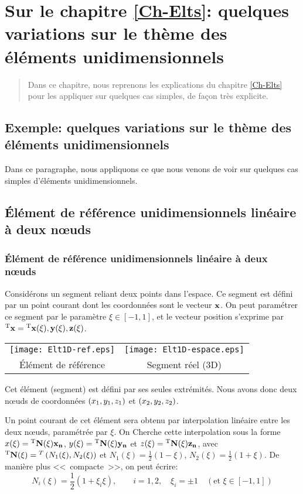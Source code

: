 \ifVersionAvecExemplesSepares
   \chapter{Sur le chapitre \ref{Ch-Elts}: quelques variations sur le thème des éléments unidimensionnels}
   \begin{abstract}
   Dans ce chapitre, nous reprenons les explications du chapitre \ref{Ch-Elts} pour les appliquer
   sur quelques cas simples, de façon très explicite.
   \end{abstract}
\else
   \section{Exemple: quelques variations sur le thème des éléments unidimensionnels}

   Dans ce paragraphe, nous appliquons ce que nous venons de voir sur quelques cas simples d'éléments unidimensionnels.
\fi

\medskip
\ifVersionAvecExemplesSepares
   \section{Élément de référence unidimensionnels linéaire à deux nœuds}\label{Sec-Elt1D2}
\else
   \subsection{Élément de référence unidimensionnels linéaire à deux nœuds}\label{Sec-Elt1D2}
\fi

Considérons un segment reliant deux points dans l'espace.
Ce segment est défini par un point courant dont les coordonnées sont le vecteur $\mathbf{x}$.
On peut paramétrer ce segment par le paramètre $\xi \in [-1,1]$, et le vecteur
position s'exprime par ${}^\mathrm{T}\mathbf{x}={}^\mathrm{T}\mathbf{x(\xi), y(\xi), z(\xi)}$.
\begin{table}[ht]\centering\small
\begin{tabular}{cc}
\texttt{[image: Elt1D-ref.eps]} &
\texttt{[image: Elt1D-espace.eps]} \\
Élément de référence & Segment réel (3D)
\end{tabular}
\end{table}
\ifVersionDuDocEstVincent

\medskip\fi
Cet élément (segment) est défini par ses seules extrémités. Nous avons donc deux
nœuds de coordonnées $\left(x_1, y_1, z_1\right)$ et $\left(x_2, y_2, z_2\right)$.\ifVersionDuDocEstVincent\par\fi
Un point courant de cet élément sera obtenu par interpolation linéaire entre les deux nœuds,
paramétrée par $\xi$. On Cherche cette interpolation sous la forme $x(\xi)={}^\mathrm{T}\mathbf{N(\xi)}\mathbf{x_n}$, $y(\xi)={}^\mathrm{T}\mathbf{N(\xi)}\mathbf{y_n}$ et $z(\xi)={}^\mathrm{T}\mathbf{N(\xi)}\mathbf{z_n}$, avec
${}^\mathrm{T}\mathbf{N(\xi)}={}^T\left( N_1(\xi), N_2(\xi)\right)$ et $N_1(\xi)=\frac12 (1-\xi)$, $N_2(\xi)=\frac12(1+\xi)$.
De manière plus <<~compacte~>>, on peut écrire:
\begin{equation} N_i(\xi)=\frac12(1+\xi_i\xi), \qquad i=1,2, \quad \xi_i=\pm1 \quad (\text{et } \xi\in[-1,1]) \end{equation}
\ifVersionDuDocEstVincent

